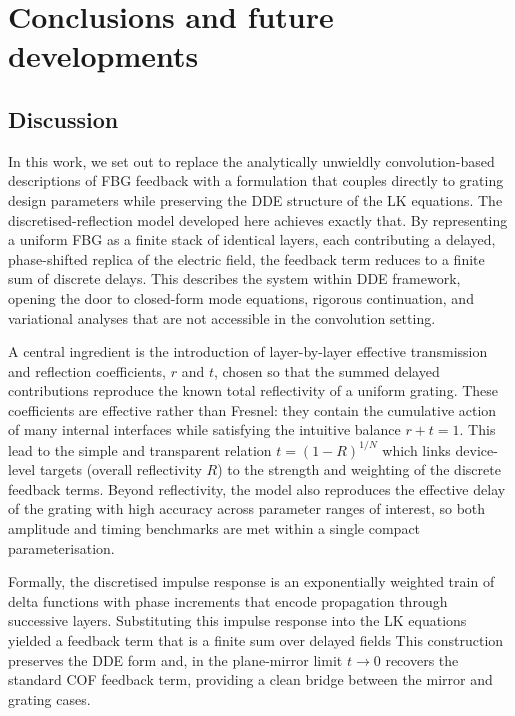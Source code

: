 \section{Conclusions and future developments}
\label{sec:conclusions}
%
\subsection{Discussion}
\label{subsec:discussion}
%
In this work, we set out to replace the analytically unwieldly convolution-based descriptions of FBG feedback with a formulation that couples directly to grating design parameters while preserving the DDE structure of the LK equations.
The discretised-reflection model developed here achieves exactly that.
By representing a uniform FBG as a finite stack of identical layers, each contributing a delayed, phase-shifted replica of the electric field, the feedback term reduces to a finite sum of discrete delays.
This describes the system within DDE framework, opening the door to closed-form mode equations, rigorous continuation, and variational analyses that are not accessible in the convolution setting.
%
\par
%
A central ingredient is the introduction of layer-by-layer effective transmission and reflection coefficients, $r$ and $t$, chosen so that the summed delayed contributions reproduce the known total reflectivity of a uniform grating.
These coefficients are effective rather than Fresnel: they contain the cumulative action of many internal interfaces while satisfying the intuitive balance $r+t=1$.
This lead to the simple and transparent relation $t = (1-R)^{1/N}$ which links device-level targets (overall reflectivity $R$) to the strength and weighting of the discrete feedback terms.
Beyond reflectivity, the model also reproduces the effective delay of the grating with high accuracy across parameter ranges of interest, so both amplitude and timing benchmarks are met within a single compact parameterisation.
%
\par
%
Formally, the discretised impulse response is an exponentially weighted train of delta functions with phase increments that encode propagation through successive layers.
Substituting this impulse response into the LK equations yielded a feedback term that is a finite sum over delayed fields 
This construction preserves the DDE form and, in the plane-mirror limit $t\rightarrow 0$ recovers the standard COF feedback term, providing a clean bridge between the mirror and grating cases.
%
\par
